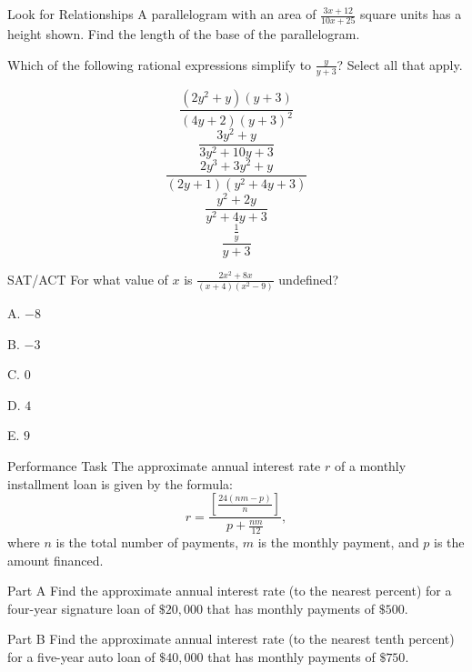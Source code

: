 \documentclass{article}
\newenvironment{practice}[2]{}{}        %
\newcommand{\answer}[1]{}               %
\begin{document}
\begin{practice}{37}{2}
Look for Relationships A parallelogram with an area of $\frac{3x+12}{10x+25}$ square units has a height shown. Find the length of the base of the parallelogram.


\answer{The length of the base of the parallelogram is $\frac35$ units.}
\end{practice}

\begin{practice}{38}{1/2}
Which of the following rational expressions simplify to $\frac{y}{y+3}$? Select all that apply.

\[
\frac{(2y^2+y)(y+3)}{(4y+2)(y+3)^2}
\]
\[
\frac{3y^2+y}{3y^2+10y+3}
\]
\[
\frac{2y^3+3y^2+y}{(2y+1)(y^2+4y+3)}
\]
\[
\frac{y^2+2y}{y^2+4y+3}
\]
\[
\frac{\frac1y}{y+3}
\]

\answer{$\frac{3y^2+y}{3y^2+10y+3}$ and $\frac{2y^3+3y^2+y}{(2y+1)(y^2+4y+3)}$}
\end{practice}

\begin{practice}{39}{1}
SAT/ACT For what value of $x$ is $\frac{2x^2+8x}{(x+4)(x^2-9)}$ undefined?

A. $-8$

B. $-3$

C. $0$

D. $4$

E. $9$

\answer{B. $-3$}
\end{practice}

\begin{practice}{40}{2}
Performance Task The approximate annual interest rate $r$ of a monthly installment loan is given by the formula:
\[
r=\frac{\left[\frac{24(nm-p)}{n}\right]}{p+\frac{nm}{12}},
\]
where $n$ is the total number of payments, $m$ is the monthly payment, and $p$ is the amount financed.

Part A Find the approximate annual interest rate (to the nearest percent) for a four-year signature loan of $\$20{,}000$ that has monthly payments of $\$500$.

Part B Find the approximate annual interest rate (to the nearest tenth percent) for a five-year auto loan of $\$40{,}000$ that has monthly payments of $\$750$.

\answer{Part A $9\%$; Part B $4.6\%$}
\end{practice}
\end{document}
